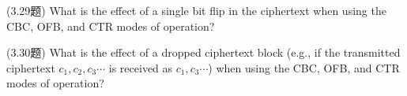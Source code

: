 \begin{questions}
        \begin{solution}
        \end{solution}

    \question (3.29题) What is the effect of a single bit flip in the ciphertext when using the CBC, OFB, and CTR modes of operation?

        \begin{solution}
        \end{solution}

    \question (3.30题) What is the effect of a dropped ciphertext block (e.g., if the transmitted ciphertext $c_1,c_2,c_3\cdots$ is received as $c_1,c_3\cdots$) when using the CBC, OFB, and CTR modes of operation?

        \begin{solution}
        \end{solution}

\end{questions}



